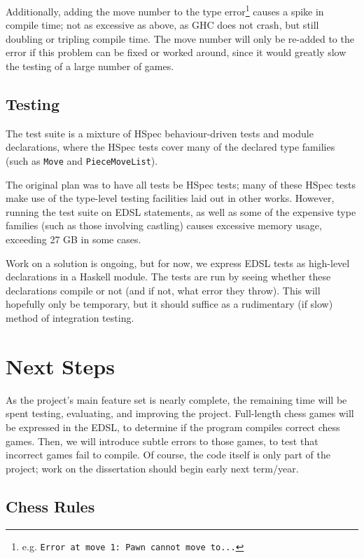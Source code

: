 \documentclass[12pt, a4paper]{scrartcl}
\begin{document}
Additionally, adding the move number to the type error\footnote{e.g. \lstinline{Error at move 1: Pawn cannot move to...}} causes a spike in compile time; not as excessive as above, as GHC does not crash, but still doubling or tripling compile time. The move number will only be re-added to the error if this problem can be fixed or worked around, since it would greatly slow the testing of a large number of games.

\subsection{Testing}

The test suite is a mixture of HSpec behaviour-driven tests\cite{hspec} and module declarations, where the HSpec tests cover many of the declared type families (such as \lstinline{Move} and \lstinline{PieceMoveList}).

The original plan was to have all tests be HSpec tests; many of these HSpec tests make use of the type-level testing facilities laid out in other works\cite{mezzo}. However, running the test suite on EDSL statements, as well as some of the expensive type families (such as those involving castling) causes excessive memory usage, exceeding 27 GB in some cases.

Work on a solution is ongoing, but for now, we express EDSL tests as high-level declarations in a Haskell module. The tests are run by seeing whether these declarations compile or not (and if not, what error they throw). This will hopefully only be temporary, but it should suffice as a rudimentary (if slow) method of integration testing.

\section{Next Steps}

As the project's main feature set is nearly complete, the remaining time will be spent testing, evaluating, and improving the project. Full-length chess games will be expressed in the EDSL, to determine if the program compiles correct chess games. Then, we will introduce subtle errors to those games, to test that incorrect games fail to compile. Of course, the code itself is only part of the project; work on the dissertation should begin early next term/year.

\subsection{Chess Rules}
\end{document}

